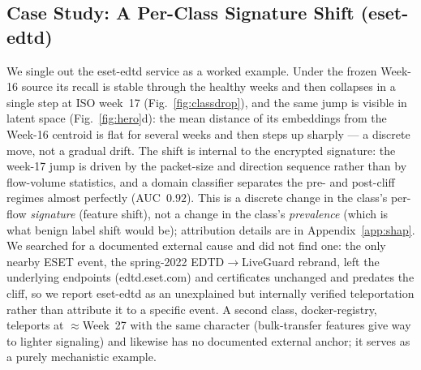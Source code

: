 \subsection{Case Study: A Per-Class Signature Shift (eset-edtd)}
\label{sec:casestudy}
We single out the eset-edtd service as a worked example. Under the frozen Week-16
source its recall is stable through the healthy weeks and then collapses in a
single step at ISO week~17 (Fig.~\ref{fig:classdrop}), and the same jump is
visible in latent space (Fig.~\ref{fig:hero}d): the mean distance of its
embeddings from the Week-16 centroid is flat for several weeks and then steps up
sharply --- a discrete move, not a gradual drift. The shift is internal to the
encrypted signature: the week-17 jump is driven by the packet-size and direction
sequence rather than by flow-volume statistics, and a domain classifier separates
the pre- and post-cliff regimes almost perfectly (AUC~$0.92$). This is a discrete
change in the class's per-flow \emph{signature} (feature shift), not a change in
the class's \emph{prevalence} (which is what benign label shift would be);
attribution details are in Appendix~\ref{app:shap}. We searched for a documented external cause and did not
find one: the only nearby ESET event, the spring-2022 EDTD$\to$LiveGuard rebrand,
left the underlying endpoints (edtd.eset.com) and certificates unchanged
and predates the cliff, so we report eset-edtd as an unexplained but internally
verified teleportation rather than attribute it to a specific event. A second
class, docker-registry, teleports at $\approx$Week~27 with the same character
(bulk-transfer features give way to lighter signaling) and likewise has no
documented external anchor; it serves as a purely mechanistic example.

